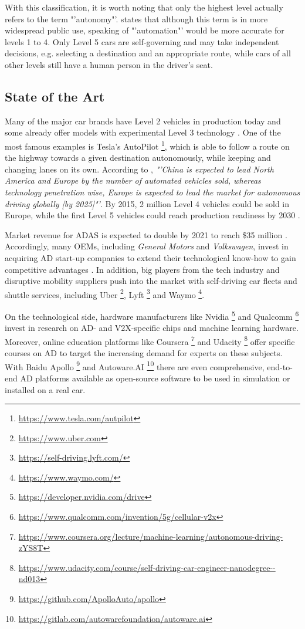 With this classification, it is worth noting that only the highest level actually refers to the term "'autonomy"'. \cite{wood2012potential} states that although this term is in more widespread public use, speaking of "'automation"' would be more accurate for levels 1 to 4. Only Level 5 cars are self-governing and may take independent decisions, e.g. selecting a destination and an appropriate route, while cars of all other levels still have a human person in the driver's seat.

\subsection{State of the Art}
\label{subsec:background:state_of_the_art}
Many of the major car brands have Level 2 vehicles in production today and some already offer models with experimental Level 3 technology \cite{Frost&SulivanConsulting2018}. One of the most famous examples is Tesla's AutoPilot \footnote{\url{https://www.tesla.com/autpilot}}, which is able to follow a route on the highway towards a given destination autonomously, while keeping and changing lanes on its own. According to \cite{Frost&SulivanConsulting2018}, \textit{"'China is expected to lead North America and Europe by the number of automated vehicles sold, whereas technology penetration wise, Europe is expected to lead the market for autonomous driving globally [by 2025]"'}. By 2015, 2 million Level 4 vehicles could be sold in Europe, while the first Level 5 vehicles could reach production readiness by 2030 \cite{McKinseyCenterforFutureMobility2019}. 

Market revenue for ADAS is expected to double by 2021 to reach \$35 million \cite{McKinseyCenterforFutureMobility2019}. Accordingly, many OEMs, including \textit{General Motors} and \textit{Volkswagen}, invest in acquiring AD start-up companies to extend their technological know-how to gain competitive advantages \cite{Korosec, Korosec2019}. In addition, big players from the tech industry and disruptive mobility suppliers push into the market with self-driving car fleets and shuttle services, including Uber \footnote{\url{https://www.uber.com}}, Lyft \footnote{\url{https://self-driving.lyft.com/}} and Waymo \footnote{\url{https://www.waymo.com/}}. 

On the technological side, hardware manufacturers like Nvidia \footnote{\url{https://developer.nvidia.com/drive}} and Qualcomm \footnote{\url{https://www.qualcomm.com/invention/5g/cellular-v2x}} invest in research on AD- and V2X-specific chips and machine learning hardware. Moreover, online education platforms like Coursera \footnote{\url{https://www.coursera.org/lecture/machine-learning/autonomous-driving-zYS8T}} and Udacity \footnote{\url{https://www.udacity.com/course/self-driving-car-engineer-nanodegree--nd013}} offer specific courses on AD to target the increasing demand for experts on these subjects. With Baidu Apollo \footnote{\url{https://github.com/ApolloAuto/apollo}} and Autoware.AI \footnote{\url{https://gitlab.com/autowarefoundation/autoware.ai}} there are even comprehensive, end-to-end AD platforms available as open-source software to be used in simulation or installed on a real car. 

